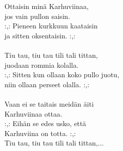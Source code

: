
Ottaisin minä Karhuviinaa, \\ jos vain pullon saisin. \\ :,: Pieneen kurkkuun kaataisin \\ ja sitten oksentaisin. :,: \\ \hspace{10mm} \\ Tiu tau, tiu tau tili tali tittan, \\ juodaan rommia kolalla. \\ :,: Sitten kun ollaan koko pullo juotu, \\ niin ollaan perseet olalla. :,: \\ \hspace{10mm} \\ Vaan ei se taitais meidän äiti \\ Karhuviinaa ottaa. \\ :,: Eihän se edes usko, että \\ Karhuviina on totta. :,: \\ Tiu tau, tiu tau tili tali tittan,...